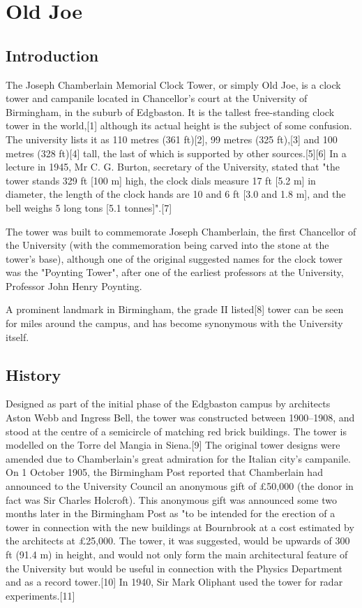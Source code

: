 \addchapheadtotoc
\chapter{Old Joe}

\section{Introduction}

The Joseph Chamberlain Memorial Clock Tower, or simply Old Joe, is a clock tower and campanile located in Chancellor's court at the University of Birmingham, in the suburb of Edgbaston. It is the tallest free-standing clock tower in the world,[1] although its actual height is the subject of some confusion. The university lists it as 110 metres (361 ft)[2], 99 metres (325 ft),[3] and 100 metres (328 ft)[4] tall, the last of which is supported by other sources.[5][6] In a lecture in 1945, Mr C. G. Burton, secretary of the University, stated that "the tower stands 329 ft [100 m] high, the clock dials measure 17 ft [5.2 m] in diameter, the length of the clock hands are 10 and 6 ft [3.0 and 1.8 m], and the bell weighs 5 long tons [5.1 tonnes]".[7]

The tower was built to commemorate Joseph Chamberlain, the first Chancellor of the University (with the commemoration being carved into the stone at the tower's base), although one of the original suggested names for the clock tower was the "Poynting Tower", after one of the earliest professors at the University, Professor John Henry Poynting.

A prominent landmark in Birmingham, the grade II listed[8] tower can be seen for miles around the campus, and has become synonymous with the University itself. 

\section{History}

Designed as part of the initial phase of the Edgbaston campus by architects Aston Webb and Ingress Bell, the tower was constructed between 1900–1908, and stood at the centre of a semicircle of matching red brick buildings. The tower is modelled on the Torre del Mangia in Siena.[9] The original tower designs were amended due to Chamberlain's great admiration for the Italian city's campanile. On 1 October 1905, the Birmingham Post reported that Chamberlain had announced to the University Council an anonymous gift of £50,000 (the donor in fact was Sir Charles Holcroft). This anonymous gift was announced some two months later in the Birmingham Post as "to be intended for the erection of a tower in connection with the new buildings at Bournbrook at a cost estimated by the architects at £25,000. The tower, it was suggested, would be upwards of 300 ft (91.4 m) in height, and would not only form the main architectural feature of the University but would be useful in connection with the Physics Department and as a record tower.[10] In 1940, Sir Mark Oliphant used the tower for radar experiments.[11]


